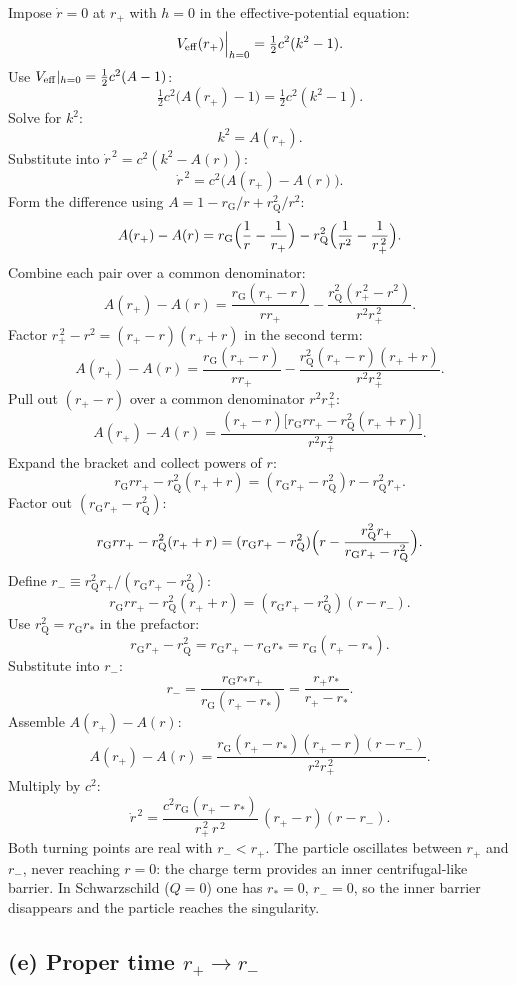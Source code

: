 \documentclass[11pt]{article}
\newcommand{\rG}{r_{\mathrm{G}}}
\newcommand{\rQ}{r_{\mathrm{Q}}}
\begin{document}
Impose $\dot r=0$ at $r_+$ with $h=0$ in the effective-potential equation:
\[
V_{\rm eff}(r_+)\Big|_{h=0}=\tfrac12 c^2(k^2-1).
\]
Use $V_{\rm eff}|_{h=0}=\tfrac12 c^2(A-1)$:
\[
\tfrac12 c^2\bigl(A(r_+)-1\bigr)=\tfrac12 c^2(k^2-1).
\]
Solve for $k^2$:
\[
k^2=A(r_+).
\]
Substitute into $\dot r^{\,2}=c^2(k^2-A(r))$:
\[
\dot r^{\,2}=c^2\bigl(A(r_+)-A(r)\bigr).
\]
Form the difference using $A=1-\rG/r+\rQ^2/r^2$:
\[
A(r_+)-A(r)=\rG\Bigl(\frac1r-\frac1{r_+}\Bigr)-\rQ^2\Bigl(\frac{1}{r^2}-\frac{1}{r_+^{\,2}}\Bigr).
\]
Combine each pair over a common denominator:
\[
A(r_+)-A(r)=\frac{\rG(r_+-r)}{r r_+}-\frac{\rQ^2(r_+^{\,2}-r^2)}{r^2 r_+^{\,2}}.
\]
Factor $r_+^{\,2}-r^2=(r_+-r)(r_++r)$ in the second term:
\[
A(r_+)-A(r)=\frac{\rG(r_+-r)}{r r_+}-\frac{\rQ^2(r_+-r)(r_++r)}{r^2 r_+^{\,2}}.
\]
Pull out $(r_+-r)$ over a common denominator $r^2 r_+^{\,2}$:
\[
A(r_+)-A(r)=\frac{(r_+-r)\bigl[\rG r r_+ -\rQ^2(r_++r)\bigr]}{r^2 r_+^{\,2}}.
\]
Expand the bracket and collect powers of $r$:
\[
\rG r r_+-\rQ^2(r_++r)=(\rG r_+-\rQ^2)r-\rQ^2 r_+.
\]
Factor out $(\rG r_+-\rQ^2)$:
\[
\rG r r_+-\rQ^2(r_++r)=(\rG r_+-\rQ^2)\Bigl(r-\frac{\rQ^2 r_+}{\rG r_+-\rQ^2}\Bigr).
\]
Define $r_-\equiv\rQ^2 r_+/(\rG r_+-\rQ^2)$:
\[
\rG r r_+-\rQ^2(r_++r)=(\rG r_+-\rQ^2)(r-r_-).
\]
Use $\rQ^2=\rG r_*$ in the prefactor:
\[
\rG r_+-\rQ^2=\rG r_+-\rG r_*=\rG(r_+-r_*).
\]
Substitute into $r_-$:
\[
r_-=\frac{\rG r_* r_+}{\rG(r_+-r_*)}=\frac{r_+ r_*}{r_+-r_*}.
\]
Assemble $A(r_+)-A(r)$:
\[
A(r_+)-A(r)=\frac{\rG(r_+-r_*)(r_+-r)(r-r_-)}{r^2 r_+^{\,2}}.
\]
Multiply by $c^2$:
\begin{equation}
\boxed{\ \dot r^{\,2}=\frac{c^2\rG(r_+-r_*)}{r_+^{\,2}\,r^{\,2}}\,(r_+-r)(r-r_-).\ }
\label{eq:rdotsq}
\end{equation}
Both turning points are real with $r_-<r_+$. The particle oscillates between $r_+$ and $r_-$, never reaching $r=0$: the charge term provides an inner centrifugal-like barrier. In Schwarzschild ($Q=0$) one has $r_*=0$, $r_-=0$, so the inner barrier disappears and the particle reaches the singularity.

\subsection*{(e) Proper time $r_+\to r_-$}
\end{document}
